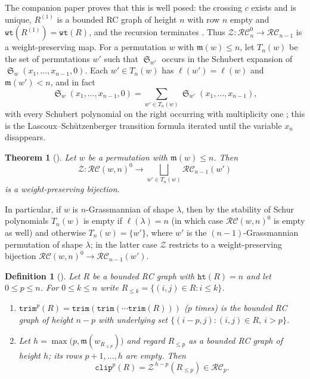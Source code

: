 \documentclass[pdflatex,sn-mathphys-num]{sn-jnl}
\numberwithin{equation}{subsection}
\DeclareMathOperator{\sch}{\mathfrak{S}}
\newcommand{\wof}[1]{w_{#1}}
\newcommand{\wtt}{\mathtt{wt}}
\newcommand{\trm}{\mathtt{trim}}
\newcommand{\zeromap}{\mathcal{Z}}
\newcommand{\hr}{\mathtt{ht}}
\newcommand{\clp}{\mathtt{clip}}
\newcommand{\RC}{\mathcal{RC}}
\newcommand{\maxd}{\mathfrak{m}}
\theoremstyle{thmstyleone}
\newtheorem{theorem}{Theorem}[section]
\theoremstyle{thmstylethree}
\newtheorem{definition}[lemma]{Definition}
\theoremstyle{thmstyletwo}
\begin{document}
The companion paper proves that this is well posed: the crossing $c$ exists and is unique, $R^{(1)}$ is a bounded RC graph of height $n$ with row $n$ empty and $\wtt(R^{(1)})=\wtt(R)$, and the recursion terminates \cite[Lemma~\ref*{B-lemma:zeroweight}]{samuelbialgebra}. Thus $\zeromap:\RC_n^0\to\RC_{n-1}$ is a weight-preserving map. For a permutation $w$ with $\maxd(w)\leq n$, let $T_n(w)$ be the set of permutations $w'$ such that $\sch_{w'}$ occurs in the Schubert expansion of $\sch_w(x_1,\ldots,x_{n-1},0)$. Each $w'\in T_n(w)$ has $\ell(w')=\ell(w)$ and $\maxd(w')<n$, and in fact
\begin{equation}\label{eq:Tn}
\sch_w(x_1,\ldots,x_{n-1},0) = \sum_{w'\in T_n(w)}\sch_{w'}(x_1,\ldots,x_{n-1}),
\end{equation}
with every Schubert polynomial on the right occurring with multiplicity one \cite[(\ref*{B-E:Tn})]{samuelbialgebra}; this is the Lascoux--Sch\"utzenberger transition formula \cite[(4.16)]{notes} iterated until the variable $x_n$ disappears.

\begin{theorem}[{\cite[Theorem~\ref*{B-theorem:zero_bijection}]{samuelbialgebra}}]\label{theorem:zero_bijection}
Let $w$ be a permutation with $\maxd(w)\leq n$. Then
$$\zeromap:\RC(w, n)^{0}\to \bigsqcup_{w'\in T_n(w)}\RC_{n-1}(w')$$
is a weight-preserving bijection.
\end{theorem}

In particular, if $w$ is $n$-Grassmannian of shape $\lambda$, then by the stability of Schur polynomials $T_n(w)$ is empty if $\ell(\lambda)=n$ (in which case $\RC(w,n)^0$ is empty as well) and otherwise $T_n(w)=\{w'\}$, where $w'$ is the $(n-1)$-Grassmannian permutation of shape $\lambda$; in the latter case $\zeromap$ restricts to a weight-preserving bijection $\RC(w,n)^0\to\RC_{n-1}(w')$.

\begin{definition}[{\cite[Definition~\ref*{B-definition:cliptrim}]{samuelbialgebra}}]\label{definition:cliptrim}
Let $R$ be a bounded RC graph with $\hr(R)=n$ and let $0\leq p\leq n$. For $0\leq k\leq n$ write $R_{\leq k}=\{(i,j)\in R: i\leq k\}$.
\begin{enumerate}
\item $\trm^p(R)=\trm(\trm(\cdots\trm(R)))$ ($p$ times) is the bounded RC graph of height $n-p$ with underlying set $\{(i-p,j):(i,j)\in R,\ i>p\}$.
\item Let $h=\max\bigl(p,\maxd(\wof{R_{\leq p}})\bigr)$ and regard $R_{\leq p}$ as a bounded RC graph of height $h$; its rows $p+1,\ldots,h$ are empty. Then
$$\clp^p(R)=\zeromap^{\,h-p}(R_{\leq p})\in\RC_p.$$
\end{enumerate}
\end{definition}
\end{document}
